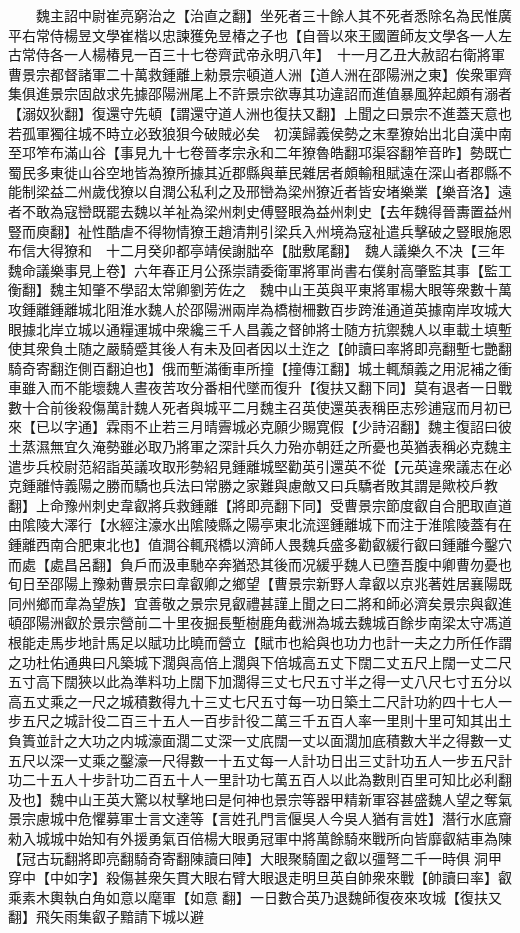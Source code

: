 　　魏主詔中尉崔亮窮治之【治直之翻】坐死者三十餘人其不死者悉除名為民惟廣平右常侍楊昱文學崔楷以忠諫獲免昱椿之子也【自晉以來王國置師友文學各一人左古常侍各一人楊椿見一百三十七卷齊武帝永明八年】　十一月乙丑大赦詔右衛將軍曹景宗都督諸軍二十萬救鍾離上勑景宗頓道人洲【道人洲在邵陽洲之東】俟衆軍齊集俱進景宗固啟求先據邵陽洲尾上不許景宗欲專其功違詔而進值暴風猝起頗有溺者【溺奴狄翻】復還守先頓【謂還守道人洲也復扶又翻】上聞之曰景宗不進蓋天意也若孤軍獨往城不時立必致狼狽今破賊必矣　初漢歸義侯勢之末羣獠始出北自漢中南至邛笮布滿山谷【事見九十七卷晉孝宗永和二年獠魯皓翻邛渠容翻笮音昨】勢既亡蜀民多東徙山谷空地皆為獠所據其近郡縣與華民雜居者頗輸租賦遠在深山者郡縣不能制梁益二州歲伐獠以自潤公私利之及邢巒為梁州獠近者皆安堵樂業【樂音洛】遠者不敢為寇巒既罷去魏以羊祉為梁州刺史傅豎眼為益州刺史【去年魏得晉夀置益州豎而庾翻】祉性酷虐不得物情獠王趙清荆引梁兵入州境為寇祉遣兵擊破之豎眼施恩布信大得獠和　十二月癸卯都亭靖侯謝朏卒【朏敷尾翻】　魏人議樂久不决【三年魏命議樂事見上卷】六年春正月公孫崇請委衛軍將軍尚書右僕射高肇監其事【監工衡翻】魏主知肇不學詔太常卿劉芳佐之　魏中山王英與平東將軍楊大眼等衆數十萬攻鍾離鍾離城北阻淮水魏人於邵陽洲兩岸為橋樹柵數百步跨淮通道英據南岸攻城大眼據北岸立城以通糧運城中衆纔三千人昌義之督帥將士随方抗禦魏人以車載土填塹使其衆負土随之嚴騎蹙其後人有未及回者因以土迮之【帥讀曰率將即亮翻塹七艷翻騎奇寄翻迮側百翻迫也】俄而塹滿衝車所撞【撞傳江翻】城土輒頹義之用泥補之衝車雖入而不能壞魏人晝夜苦攻分番相代墜而復升【復扶又翻下同】莫有退者一日戰數十合前後殺傷萬計魏人死者與城平二月魏主召英使還英表稱臣志殄逋寇而月初已來【已以字通】霖雨不止若三月晴霽城必克願少賜寛假【少詩沼翻】魏主復詔曰彼土蒸濕無宜久淹勢雖必取乃將軍之深計兵久力殆亦朝廷之所憂也英猶表稱必克魏主遣步兵校尉范紹詣英議攻取形勢紹見鍾離城堅勸英引還英不從【元英違衆議志在必克鍾離恃義陽之勝而驕也兵法曰常勝之家難與慮敵又曰兵驕者敗其謂是歟校戶教翻】上命豫州刺史韋叡將兵救鍾離【將即亮翻下同】受曹景宗節度叡自合肥取直道由隂陵大澤行【水經注濠水出隂陵縣之陽亭東北流逕鍾離城下而注于淮隂陵蓋有在鍾離西南合肥東北也】值澗谷輒飛橋以濟師人畏魏兵盛多勸叡緩行叡曰鍾離今鑿穴而處【處昌呂翻】負戶而汲車馳卒奔猶恐其後而况緩乎魏人已墮吾腹中卿曹勿憂也旬日至邵陽上豫勑曹景宗曰韋叡卿之鄉望【曹景宗新野人韋叡以京兆著姓居襄陽既同州鄉而韋為望族】宜善敬之景宗見叡禮甚謹上聞之曰二將和師必濟矣景宗與叡進頓邵陽洲叡於景宗營前二十里夜掘長塹樹鹿角截洲為城去魏城百餘步南梁太守馮道根能走馬步地計馬足以賦功比曉而營立【賦市也給與也功力也計一夫之力所任作謂之功杜佑通典曰凡築城下濶與高倍上濶與下倍城高五丈下闊二丈五尺上闊一丈二尺五寸高下闊狹以此為準料功上闊下加濶得三丈七尺五寸半之得一丈八尺七寸五分以高五丈乘之一尺之城積數得九十三丈七尺五寸每一功日築土二尺計功約四十七人一步五尺之城計役二百三十五人一百步計役二萬三千五百人率一里則十里可知其出土負簣並計之大功之内城濠面濶二丈深一丈㡳闊一丈以面濶加底積數大半之得數一丈五尺以深一丈乘之鑿濠一尺得數一十五丈每一人計功日出三丈計功五人一步五尺計功二十五人十步計功二百五十人一里計功七萬五百人以此為數則百里可知比必利翻及也】魏中山王英大驚以杖擊地曰是何神也景宗等器甲精新軍容甚盛魏人望之奪氣景宗慮城中危懼募軍士言文達等【言姓孔門言偃吳人今吳人猶有言姓】潛行水底齎勑入城城中始知有外援勇氣百倍楊大眼勇冠軍中將萬餘騎來戰所向皆靡叡結車為陳【冠古玩翻將即亮翻騎奇寄翻陳讀曰陣】大眼聚騎圍之叡以彊弩二千一時俱洞甲穿中【中如字】殺傷甚衆矢貫大眼右臂大眼退走明旦英自帥衆來戰【帥讀曰率】叡乘素木輿執白角如意以麾軍【如意翻】一日數合英乃退魏師復夜來攻城【復扶又翻】飛矢雨集叡子黯請下城以避